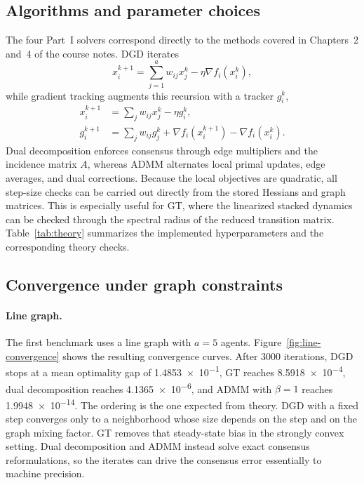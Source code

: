 \documentclass[11pt,a4paper]{article}
\begin{document}
\subsection{Algorithms and parameter choices}
The four Part~I solvers correspond directly to the methods covered in Chapters~2 and~4 of the course notes. DGD iterates
\begin{equation}
    x_i^{k+1}=\sum_{j=1}^a w_{ij}x_j^k-\eta\nabla f_i(x_i^k),
\end{equation}
while gradient tracking augments this recursion with a tracker $g_i^k$,
\begin{align}
    x_i^{k+1} &= \sum_j w_{ij}x_j^k-\eta g_i^k,\\
    g_i^{k+1} &= \sum_j w_{ij}g_j^k + \nabla f_i(x_i^{k+1})-\nabla f_i(x_i^k).
\end{align}
Dual decomposition enforces consensus through edge multipliers and the incidence matrix $A$, whereas ADMM alternates local primal updates, edge averages, and dual corrections. Because the local objectives are quadratic, all step-size checks can be carried out directly from the stored Hessians and graph matrices. This is especially useful for GT, where the linearized stacked dynamics can be checked through the spectral radius of the reduced transition matrix. Table~\ref{tab:theory} summarizes the implemented hyperparameters and the corresponding theory checks.



\subsection{Convergence under graph constraints}

\paragraph{Line graph.}
The first benchmark uses a line graph with $a=5$ agents. Figure~\ref{fig:line-convergence} shows the resulting convergence curves. After $3000$ iterations, DGD stops at a mean optimality gap of \num{1.4853e-1}, GT reaches \num{8.5918e-4}, dual decomposition reaches \num{4.1365e-6}, and ADMM with $\beta=1$ reaches \num{1.9948e-14}. The ordering is the one expected from theory. DGD with a fixed step converges only to a neighborhood whose size depends on the step and on the graph mixing factor. GT removes that steady-state bias in the strongly convex setting. Dual decomposition and ADMM instead solve exact consensus reformulations, so the iterates can drive the consensus error essentially to machine precision.
\end{document}
